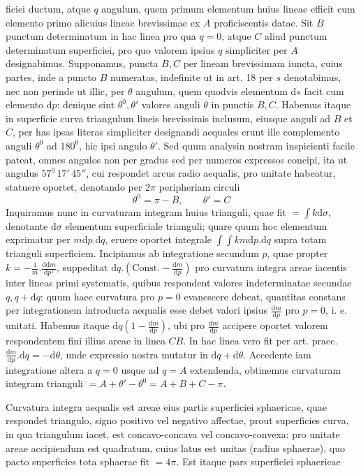 %
ficiei ductum, atque \(q\) angulum, quem primum elementum huius lineae efficit cum elemento primo alicuius lineae brevissimae ex \(A\) proficiscentis datae. Sit \(B\) punctum determinatum in hac linea pro qua \(q=0\), atque \(C\) aliud punctum determinatum superficiei, pro quo valorem ipsius \(q\) simpliciter per \(A\) designabimus. Supponamus, puncta \(B,C\) per lineam brevissimam iuncta, cuius partes, inde a puncto \(B\) numeratas, indefinite ut in art. 18 per \(s\) denotabimus, nec non perinde ut illic, per \(\theta\) angulum, quem quodvis elementum \(\mathrm{d}s\) facit cum elemento \(\mathrm{d}p\): denique sint \(\theta^0,\theta'\) valores anguli \(\theta\) in punctis \(B,C\). Habemus itaque in superficie curva triangulum lineis brevissimis inclusum, eiusque anguli ad \(B\) et \(C\), per has ipsas literas simpliciter designandi aequales erunt ille complemento anguli \(\theta^0\) ad \(180^0\), hic ipsi angulo \(\theta'\). Sed quum analysin nostram inspicienti facile pateat, omnes angulos non per gradus sed per numeros expressos concipi, ita ut angulus \(57^0\,17'\,45''\), cui respondet arcus radio aequalis, pro unitate habeatur, statuere oportet, denotando per \(2\pi\) peripheriam circuli
\[
\theta^0=\pi-B,\qquad\theta'=C
\]
Inquiramus nunc in curvaturam integram huius trianguli, quae fit \(=\int k\mathrm{d}\sigma\), denotante \(\mathrm{d}\sigma\) elementum superficiale trianguli; quare quum hoc elementum exprimatur per \(m\mathrm{d}p\mathord{.}\mathrm{d}q\), eruere oportet integrale \(\int\!\int km\mathrm{d}p\mathord{.}\mathrm{d}q\) supra totam trianguli superficiem. Incipiamus ab integratione secundum \(p\), quae propter \(k=-\frac{1}{m}\mathord{.}\frac{\mathrm{d}\mathrm{d}m}{\mathrm{d}p^2}\), suppeditat \(\mathrm{d}q\mathord{.}(\mathrm{Const.}-\frac{\mathrm{d}m}{\mathrm{d}p})\) pro curvatura integra areae iacentis inter lineas primi systematis, quibus respondent valores indeterminatae secundae \(q,q+\mathrm{d}q\): quum haec curvatura pro \(p=0\) evanescere debeat, quantitas constans per integrationem introducta aequalis esse debet valori ipsius \(\frac{\mathrm{d}m}{\mathrm{d}p}\) pro \(p=0\), i. e. unitati. Habemus itaque \(\mathrm{d}q(1-\frac{\mathrm{d}m}{\mathrm{d}p})\), ubi pro \(\frac{\mathrm{d}m}{\mathrm{d}p}\) accipere oportet valorem respondentem fini illius areae in linea \(CB\). In hac linea vero fit per art. praec. \(\frac{\mathrm{d}m}{\mathrm{d}p}\mathord{.}\mathrm{d}q=-\mathrm{d}\theta\), unde expressio nostra mutatur in \(\mathrm{d}q+\mathrm{d}\theta\). Accedente iam integratione altera a \(q=0\) usque ad \(q=A\) extendenda, obtinemus curvaturam integram trianguli \(=A+\theta'-\theta^0=A+B+C-\pi\).

Curvatura integra aequalis est areae eius partis superficiei sphaericae, quae respondet triangulo, signo positivo vel negativo affectae, prout superficies curva, in qua triangulum iacet, est concavo-concava vel concavo-convexa: pro unitate areae accipiendum est quadratum, cuius latus est unitas (radius sphaerae), quo pacto superficies tota sphaerae fit \(=4\pi\). Est itaque pars superficiei sphaericae
